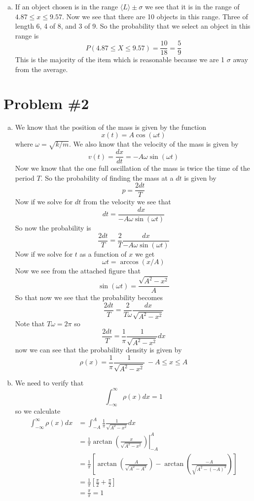 \documentclass[11pt]{article}
\numberwithin{equation}{section}
\begin{document}
\begin{enumerate}[(a)]
\item
If an object chosen is in the range $\langle L\rangle\pm\sigma$ we see that it is in the range of $4.87\le x\le9.57$. Now we see that there are 10 objects in this range. Three of length 6, 4 of 8, and 3 of 9. So the probability that we select an object in this range is 
$$P(4.87\le X\le 9.57) = \frac{10}{18} = \frac{5}{9}$$ 
This is the majority of the item which is reasonable because we are 1 $\sigma$ away from the average.
\end{enumerate}

\section{Problem \#2}
\begin{enumerate}[(a)]
\item
We know that the position of the mass is given by the function
$$x(t) = A\cos\left(\omega t\right)$$ 
where $\omega=\sqrt{k/m}$. We also know that the velocity of the mass is given by
$$v(t) = \frac{dx}{dt} = -A\omega\sin(\omega t)$$
Now we know that the one full oscillation of the mass is twice the time of the period $T$. So the probability of finding the mass at a $dt$ is given by
$$p = \frac{2dt}{T}$$
Now if we solve for $dt$ from the velocity we see that
$$dt = \frac{dx}{-A\omega\sin(\omega t)}$$
So now the probability is 
$$\frac{2dt}{T} = \frac{2}{T}\frac{dx}{-A\omega\sin(\omega t)}$$
Now if we solve for $t$ as a function of $x$ we get
$$\omega t = \arccos(x/A)$$
Now we see from the attached figure that
$$\sin(\omega t) = \frac{\sqrt{A^2-x^2}}{A}$$
So that now we see that the probability becomes
$$\frac{2dt}{T} = \frac{2}{T\omega}\frac{dx}{\sqrt{A^2-x^2}}$$
Note that $T\omega=2\pi$ so 
$$\frac{2dt}{T} = \frac{1}{\pi}\frac{1}{\sqrt{A^2-x^2}}dx$$
now we can see that the probability density is given by
$$\rho(x) = \frac{1}{\pi}\frac{1}{\sqrt{A^2-x^2}}\ -A\le x\le A$$

\item
We need to verify that
$$\int_{-\infty}^{\infty}\rho(x)dx = 1$$
so we calculate
\begin{align*}
\int_{-\infty}^{\infty}\rho(x)dx &= \int_{-A}^{A}\frac{1}{\pi}\frac{1}{\sqrt{A^2-x^2}}dx\\
&= \frac{1}{\pi}\left.\arctan\left(\frac{x}{\sqrt{A^2-x^2}}\right)\right|_{-A}^{A}\\
&= \frac{1}{\pi}\left[\arctan\left(\frac{A}{\sqrt{A^2-A^2}}\right) - \arctan\left(\frac{-A}{\sqrt{A^2-(-A)^2}}\right)\right]\\
&= \frac{1}{\pi}\left[\frac{\pi}{2}+\frac{\pi}{2}\right]\\
&= \frac{\pi}{\pi} = 1
\end{align*}


\end{enumerate}
\end{document}
